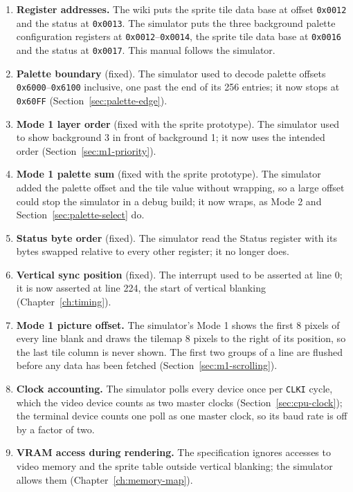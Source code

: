 \begin{enumerate}
	\item \textbf{Register addresses.} The wiki puts the sprite tile data base at offset \texttt{0x0012} and the status at
	      \texttt{0x0013}. The simulator puts the three background palette configuration registers at
	      \texttt{0x0012}--\texttt{0x0014}, the sprite tile data base at \texttt{0x0016} and the status at \texttt{0x0017}.
	      This manual follows the simulator.
	\item \textbf{Palette boundary} (fixed). The simulator used to decode palette offsets \texttt{0x6000}--\texttt{0x6100}
	      inclusive, one past the end of its 256 entries; it now stops at \texttt{0x60FF} (Section~\ref{sec:palette-edge}).
	\item \textbf{Mode 1 layer order} (fixed with the sprite prototype). The simulator used to show background 3 in front of
	      background 1; it now uses the intended order (Section~\ref{sec:m1-priority}).
	\item \textbf{Mode 1 palette sum} (fixed with the sprite prototype). The simulator added the palette offset and the
	      tile value without wrapping, so a large offset could stop the simulator in a debug build; it now wraps, as
	      Mode 2 and Section~\ref{sec:palette-select} do.
	\item \textbf{Status byte order} (fixed). The simulator read the Status register with its bytes swapped relative to every
	      other register; it no longer does.
	\item \textbf{Vertical sync position} (fixed). The interrupt used to be asserted at line 0; it is now asserted at line
	      224, the start of vertical blanking (Chapter~\ref{ch:timing}).
	\item \textbf{Mode 1 picture offset.} The simulator's Mode 1 shows the first 8 pixels of every line blank and draws the
	      tilemap 8 pixels to the right of its position, so the last tile column is never shown. The first two groups of a line
	      are flushed before any data has been fetched (Section~\ref{sec:m1-scrolling}).
	\item \textbf{Clock accounting.} The simulator polls every device once per \texttt{CLKI} cycle, which the video device counts
	      as two master clocks (Section~\ref{sec:cpu-clock}); the terminal device counts one poll as one master clock, so its
	      baud rate is off by a factor of two.
	\item \textbf{VRAM access during rendering.} The specification ignores accesses to video memory and the sprite table outside
	      vertical blanking; the simulator allows them (Chapter~\ref{ch:memory-map}).
\end{enumerate}

